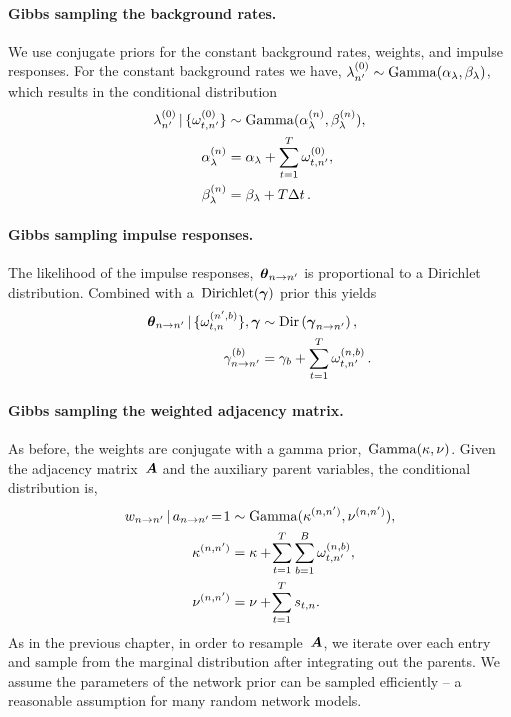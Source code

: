 \paragraph{Gibbs sampling the background rates.}
We use conjugate priors for the constant background rates, weights,
and impulse responses.  For the constant background rates we have,
${\lambda_{n'}^{(0)} \sim\mathrm{Gamma}(\alpha_\lambda, \beta_\lambda)}$,
which results in the conditional distribution
\begin{align*}
\lambda_{n'}^{(0)} \,|\, \{\omega_{t,n'}^{(0)}\} &\sim
\mathrm{Gamma}(\alpha_\lambda^{(n)}, \beta_\lambda^{(n)}), \\
\alpha_\lambda^{(n)} &= \alpha_\lambda + \sum_{t=1}^T \omega_{t,n'}^{(0)}, \\
\beta_\lambda^{(n)} &= \beta_\lambda + T \Delta t\,.
\end{align*}

\paragraph{Gibbs sampling impulse responses.}
The likelihood of the impulse responses,~$\boldsymbol{\theta}_{n \to n'}$ is
proportional to a Dirichlet distribution.  Combined with
a~$\text{Dirichlet}(\boldsymbol{\gamma})$ prior this yields
\begin{align*}
  \boldsymbol{\theta}_{n \to n'} \,|\, \{\omega_{t,n}^{(n',b)}\}, \boldsymbol{\gamma}
  &\sim \mathrm{Dir}\left( \boldsymbol{\gamma}_{n \to n'} \right), \\
  \gamma_{n \to n'}^{(b)} &=  \gamma_b + \sum_{t=1}^T \omega_{t,n'}^{(n, b)}\,.
\end{align*}

\paragraph{Gibbs sampling the weighted adjacency matrix.}
As before, the weights are conjugate with a gamma
prior,~$\mathrm{Gamma}(\kappa, \nu)$.  Given the adjacency matrix~$\boldsymbol{A}$
and the auxiliary parent variables, the conditional distribution is,
\begin{align*}
  w_{n \to n'} \,|\, a_{n \to n'}\!=\!1
  &\sim \mathrm{Gamma}(\kappa^{(n,n')}, \nu^{(n,n')}), \\
  \kappa^{(n,n')} &= \kappa +\! \sum_{t=1}^T \sum_{b=1}^B \omega_{t,n'}^{(n,b)}, \\
  \nu^{(n,n')} &= \nu +\! \sum_{t=1}^T s_{t,n}.
\end{align*}
As in the previous chapter, in order to resample~$\boldsymbol{A}$, we iterate over
each entry and sample from the marginal distribution after integrating
out the parents. We assume the parameters of the network prior can be
sampled efficiently -- a reasonable assumption for many random network
models.

